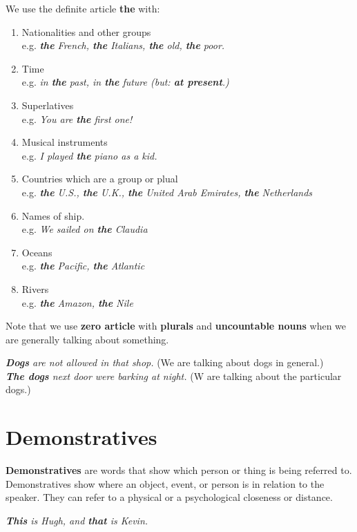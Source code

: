 \documentclass[10pt,a4paper]{article}
\begin{document}
We use the definite article \textbf{the} with:
\begin{enumerate}[label=\alph*)]
\item Nationalities and other groups\\
		e.g. \textit{ \textbf{the} French, \textbf{the} Italians, \textbf{the} old, \textbf{the} poor.}
\item Time\\
		e.g. \textit{in \textbf{the} past, in \textbf{the} future (but: \textbf{at present}.)}
\item Superlatives\\
		e.g. \textit{You are \textbf{the} first one!}
\item Musical instruments\\
		e.g. \textit{I played \textbf{the} piano as a kid.}
\item Countries which are a group or plual\\
		e.g. \textit{ \textbf{the} U.S., \textbf{the} U.K., \textbf{the} United Arab Emirates, \textbf{the} Netherlands }
\item Names of ship.\\
		e.g. \textit{We sailed on \textbf{the} Claudia}
\item Oceans\\
		e.g. \textit{ \textbf{the} Pacific, \textbf{the} Atlantic}
\item Rivers\\
		e.g. \textit{ \textbf{the} Amazon, \textbf{the} Nile}
\end{enumerate}

Note that we use \textbf{zero article} with \textbf{plurals} and \textbf{uncountable nouns} when we are generally talking about something.
\begin{center}
		\textit{ \textbf{Dogs} are not allowed in that shop.} (We are talking about dogs in general.)\\
		\textit{ \textbf{The dogs} next door were barking at night.} (W are talking about the particular dogs.)
\end{center}

\section{Demonstratives}

\textbf{Demonstratives} are words that show which person or thing is being referred to.
Demonstratives show where an object, event, or person is in relation to the speaker. They can refer to a physical or a psychological closeness or distance.
\begin{center}
		\textit{\textbf{This} is Hugh, and \textbf{that} is Kevin.}
\end{center}
\end{document}
